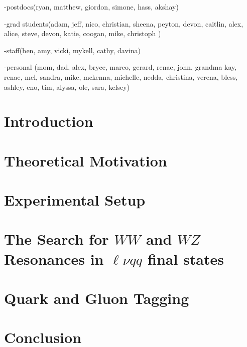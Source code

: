 \begin{frontmatter}
\begin{acknowledgements}
-postdocs(ryan, matthew, giordon, simone, hass, akshay)


-grad students(adam, jeff, nico, christian, sheena, peyton, devon, caitlin, alex, alice, steve, devon, katie, coogan, mike, christoph  )


-staff(ben, amy, vicki, mykell, cathy, davina)


-personal (mom, dad, alex, bryce, marco, gerard, renae, john, grandma kay, renae, mel, sandra, mike, mckenna, michelle, nedda, christina, verena, bless, ashley, eno, tim, alyssa, ole, sara, kelsey)



\end{acknowledgements}

\end{frontmatter}
\part{Introduction}


\part{Theoretical Motivation}


\part {Experimental Setup}

%

\part{The Search for $WW$ and $WZ$ Resonances in $\ell\nu qq$ final states}



\part{Quark and Gluon Tagging}


\part{Conclusion}



\nocite{*}

\singlespacing

\doublespacing


